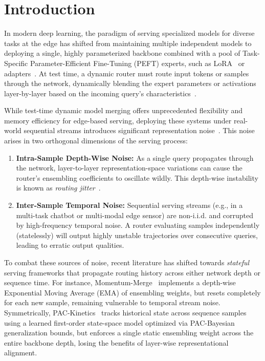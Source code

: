 \section{Introduction}
\label{sec:intro}

In modern deep learning, the paradigm of serving specialized models for diverse tasks at the edge has shifted from maintaining multiple independent models to deploying a single, highly parameterized backbone combined with a pool of Task-Specific Parameter-Efficient Fine-Tuning (PEFT) experts, such as LoRA~\cite{hu2021lora} or adapters~\cite{houlsby2019parameter}. At test time, a dynamic router must route input tokens or samples through the network, dynamically blending the expert parameters or activations layer-by-layer based on the incoming query's characteristics~\cite{sable2025, malkin2023}. 

While test-time dynamic model merging offers unprecedented flexibility and memory efficiency for edge-based serving, deploying these systems under real-world sequential streams introduces significant representation noise~\cite{momentummerge}. This noise arises in two orthogonal dimensions of the serving process:
\begin{enumerate}
    \item \textbf{Intra-Sample Depth-Wise Noise:} As a single query propagates through the network, layer-to-layer representation-space variations can cause the router's ensembling coefficients to oscillate wildly. This depth-wise instability is known as \emph{routing jitter}~\cite{sable2025}.
    \item \textbf{Inter-Sample Temporal Noise:} Sequential serving streams (e.g., in a multi-task chatbot or multi-modal edge sensor) are non-i.i.d. and corrupted by high-frequency temporal noise. A router evaluating samples independently (statelessly) will output highly unstable trajectories over consecutive queries, leading to erratic output qualities.
\end{enumerate}

To combat these sources of noise, recent literature has shifted towards \emph{stateful} serving frameworks that propagate routing history across either network depth or sequence time. For instance, Momentum-Merge~\cite{momentummerge} implements a depth-wise Exponential Moving Average (EMA) of ensembling weights, but resets completely for each new sample, remaining vulnerable to temporal stream noise. Symmetrically, PAC-Kinetics~\cite{pac_kinetics} tracks historical state across sequence samples using a learned first-order state-space model optimized via PAC-Bayesian generalization bounds, but enforces a single static ensembling weight across the entire backbone depth, losing the benefits of layer-wise representational alignment. 


